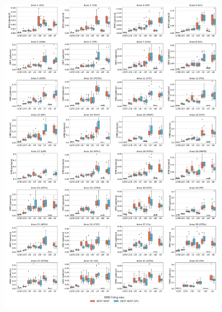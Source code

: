 \documentclass[a4paper, 12pt, twoside, openright]{book}
\begin{document}
\begin{figure}[H]
    \centering
    \includegraphics[width=\columnwidth]{figures/emd_boxplot_vert_gs_firing_rate.pdf}
\end{figure}
\end{document}
